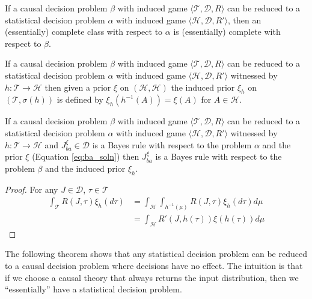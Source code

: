 \begin{corollary}
If a causal decision problem $\beta$ with induced game $\langle \mathscr{T},\mathscr{D}, R\rangle$ can be reduced to a statistical decision problem $\alpha$ with induced game $\langle \mathscr{H},\mathscr{D},R' \rangle$, then an (essentially) complete class with respect to $\alpha$ is (essentially) complete with respect to $\beta$.
\end{corollary}

\begin{definition}
If a causal decision problem $\beta$ with induced game $\langle \mathscr{T},\mathscr{D}, R\rangle$ can be reduced to a statistical decision problem $\alpha$ with induced game $\langle \mathscr{H},\mathscr{D},R' \rangle$ witnessed by $h:\mathscr{T}\to\mathscr{H}$ then given a prior $\xi$ on $(\mathscr{H},\mathcal{H})$ the induced prior $\xi_h$ on $(\mathscr{T},\sigma(h))$ is defined by $\xi_h(h^{-1}(A)) = \xi(A)$ for $A\in \mathcal{H}$.
\end{definition}

\begin{lemma}
If a causal decision problem $\beta$ with induced game $\langle \mathscr{T},\mathscr{D}, R\rangle$ can be reduced to a statistical decision problem $\alpha$ with induced game $\langle \mathscr{H},\mathscr{D},R' \rangle$ witnessed by $h:\mathscr{T}\to\mathscr{H}$ and $J_{ba}^\xi\in \mathscr{D}$ is a Bayes rule with respect to the problem $\alpha$ and the prior $\xi$ (Equation \ref{eq:ba_soln}) then $J_{ba}^\xi$ is a Bayes rule with respect to the problem $\beta$ and the induced prior $\xi_h$.
\end{lemma}

\begin{proof}
For any $J\in\mathscr{D}$, $\tau\in \mathscr{T}$
\begin{align}
    \int_\mathscr{T} R(J,\tau) \xi_h(d\tau) &= \int_\mathscr{H} \int_{h^{-1}(\mu)} R(J,\tau) \xi_h(d\tau)d\mu\\
                                            &= \int_\mathscr{H} R'(J,h(\tau)) \xi(h(\tau))d\mu
\end{align}
\end{proof}

The following theorem shows that any statistical decision problem can be reduced to a causal decision problem where decisions have no effect. The intuition is that if we choose a causal theory that always returns the input distribution, then we ``essentially'' have a statistical decision problem.

